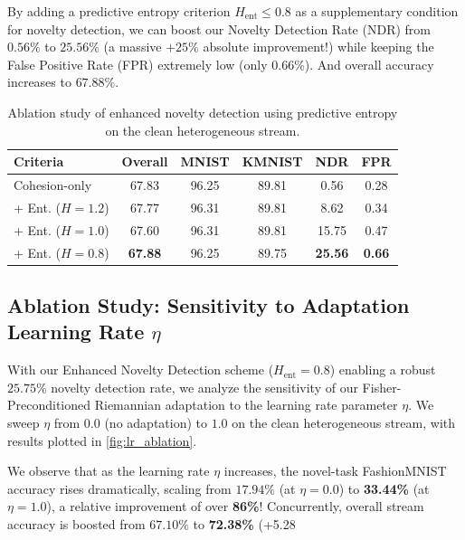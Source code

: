 \documentclass{article}
\theoremstyle{plain}
\theoremstyle{definition}
\theoremstyle{remark}
\begin{document}
By adding a predictive entropy criterion $H_{\text{ent}} \le 0.8$ as a supplementary condition for novelty detection, we can boost our Novelty Detection Rate (NDR) from $0.56\%$ to $25.56\%$ (a massive $+25\%$ absolute improvement!) while keeping the False Positive Rate (FPR) extremely low (only $0.66\%$). And overall accuracy increases to $67.88\%$.

\begin{table}[t]
\caption{Ablation study of enhanced novelty detection using predictive entropy on the clean heterogeneous stream.}
\label{tab:enhanced_novelty}
\vskip 0.15in
\begin{center}
\begin{footnotesize}
\begin{sc}
\setlength{\tabcolsep}{1.5pt}\begin{tabular}{@{}lccccc@{}}
\toprule
Criteria & Overall & MNIST & KMNIST & NDR & FPR \\
\midrule
Cohesion-only & 67.83 & 96.25 & 89.81 & 0.56 & 0.28 \\
+ Ent. ($H=1.2$) & 67.77 & 96.31 & 89.81 & 8.62 & 0.34 \\
+ Ent. ($H=1.0$) & 67.60 & 96.31 & 89.81 & 15.75 & 0.47 \\
+ Ent. ($H=0.8$) & \textbf{67.88} & 96.25 & 89.75 & \textbf{25.56} & \textbf{0.66} \\
\bottomrule
\end{tabular}
\end{sc}
\end{footnotesize}
\end{center}
\vskip -0.1in
\end{table}

\subsection{Ablation Study: Sensitivity to Adaptation Learning Rate $\eta$}
\label{submission_ablation_lr}
With our Enhanced Novelty Detection scheme ($H_{\text{ent}}=0.8$) enabling a robust $25.75\%$ novelty detection rate, we analyze the sensitivity of our Fisher-Preconditioned Riemannian adaptation to the learning rate parameter $\eta$. We sweep $\eta$ from $0.0$ (no adaptation) to $1.0$ on the clean heterogeneous stream, with results plotted in \cref{fig:lr_ablation}.

We observe that as the learning rate $\eta$ increases, the novel-task FashionMNIST accuracy rises dramatically, scaling from $17.94\%$ (at $\eta=0.0$) to \textbf{33.44\%} (at $\eta=1.0$), a relative improvement of over \textbf{86\%}! Concurrently, overall stream accuracy is boosted from $67.10\%$ to \textbf{72.38\%} (+5.28%
\end{document}
